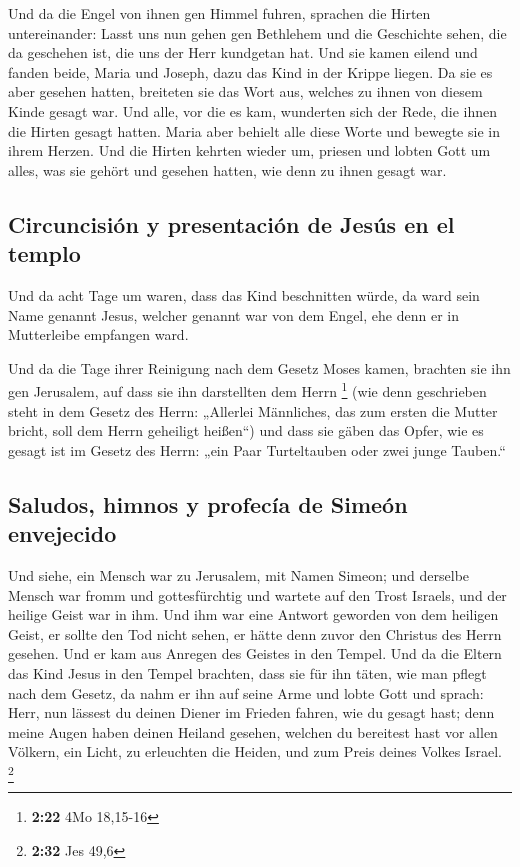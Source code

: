  Und da die Engel von ihnen gen Himmel fuhren, sprachen
die Hirten untereinander: Lasst uns nun gehen gen Bethlehem und die
Geschichte sehen, die da geschehen ist, die uns der Herr kundgetan hat.
 Und sie kamen eilend und fanden beide, Maria und Joseph,
dazu das Kind in der Krippe liegen.  Da sie es aber
gesehen hatten, breiteten sie das Wort aus, welches zu ihnen von diesem
Kinde gesagt war.  Und alle, vor die es kam, wunderten
sich der Rede, die ihnen die Hirten gesagt hatten.  Maria
aber behielt alle diese Worte und bewegte sie in ihrem Herzen.
 Und die Hirten kehrten wieder um, priesen und lobten
Gott um alles, was sie gehört und gesehen hatten, wie denn zu ihnen
gesagt war.

\hypertarget{circuncisiuxf3n-y-presentaciuxf3n-de-jesuxfas-en-el-templo}{%
\subsection{Circuncisión y presentación de Jesús en el
templo}\label{circuncisiuxf3n-y-presentaciuxf3n-de-jesuxfas-en-el-templo}}

 Und da acht Tage um waren, dass das Kind beschnitten
würde, da ward sein Name genannt Jesus, welcher genannt war von dem
Engel, ehe denn er in Mutterleibe empfangen ward.

 Und da die Tage ihrer Reinigung nach dem Gesetz Moses
kamen, brachten sie ihn gen Jerusalem, auf dass sie ihn darstellten dem
Herrn \footnote{\textbf{2:22} 4Mo 18,15-16}  (wie denn
geschrieben steht in dem Gesetz des Herrn: „Allerlei Männliches, das zum
ersten die Mutter bricht, soll dem Herrn geheiligt heißen``)
 und dass sie gäben das Opfer, wie es gesagt ist im
Gesetz des Herrn: „ein Paar Turteltauben oder zwei junge Tauben.``

\hypertarget{saludos-himnos-y-profecuxeda-de-simeuxf3n-envejecido}{%
\subsection{Saludos, himnos y profecía de Simeón
envejecido}\label{saludos-himnos-y-profecuxeda-de-simeuxf3n-envejecido}}

 Und siehe, ein Mensch war zu Jerusalem, mit Namen
Simeon; und derselbe Mensch war fromm und gottesfürchtig und wartete auf
den Trost Israels, und der heilige Geist war in ihm.  Und
ihm war eine Antwort geworden von dem heiligen Geist, er sollte den Tod
nicht sehen, er hätte denn zuvor den Christus des Herrn gesehen.
 Und er kam aus Anregen des Geistes in den Tempel. Und da
die Eltern das Kind Jesus in den Tempel brachten, dass sie für ihn
täten, wie man pflegt nach dem Gesetz,  da nahm er ihn
auf seine Arme und lobte Gott und sprach:  Herr, nun
lässest du deinen Diener im Frieden fahren, wie du gesagt hast;
 denn meine Augen haben deinen Heiland gesehen,
 welchen du bereitest hast vor allen Völkern,
 ein Licht, zu erleuchten die Heiden, und zum Preis
deines Volkes Israel. \footnote{\textbf{2:32} Jes 49,6}

